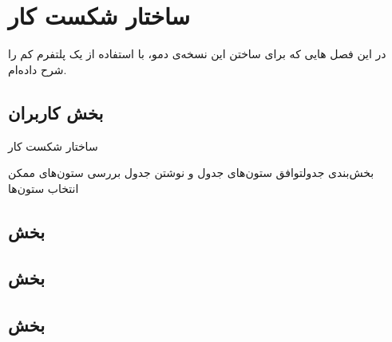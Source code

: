 \chapter{ساختار شکست کار}
در این فصل 
هایی
که برای ساختن این نسخه‌ی دمو، با استفاده از یک پلتفرم کم را شرح داده‌ام.

\section{بخش کاربران}
\begin{wbsbox}{ساختار شکست کار}
\begin{wbssub}{بخش‌بندی جدول}{توافق ستون‌های جدول و نوشتن جدول}
\task بررسی ستون‌های ممکن \\
\task انتخاب ستون‌ها
\end{wbssub}
\end{wbsbox}

\section{بخش }
\section{بخش }
\section{بخش }

